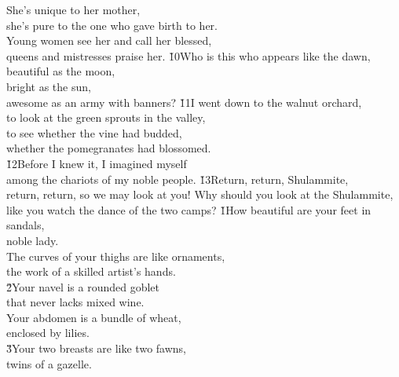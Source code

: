 \begin{poetry}
\poeml She's unique to her mother, \\
\poemll    she's pure to the one who gave birth to her. \\
\poeml Young women see her and call her blessed, \\
\poemll    queens and mistresses praise her.
\poeml \v{10}Who is this who appears like the dawn, \\
\poemll    beautiful as the moon, \\
\poeml bright as the sun, \\
\poemll    awesome as an army with banners?
\poeml \v{11}I went down to the walnut orchard, \\
\poemll    to look at the green sprouts in the valley, \\
\poeml to see whether the vine had budded, \\
\poemll    whether the pomegranates had blossomed. \\
\poeml \v{12}Before I knew it, I imagined myself \\
\poemll    among the chariots of my noble people.
\poeml \v{13}Return, return, Shulammite, \\
\poemll    return, return, so we may look at you!
\poeml Why should you look at the Shulammite, \\
\poemll    like you watch the dance of the two camps?
\poeml {}
\v{1}How beautiful are your feet in sandals, \\
\poeml noble lady. \\
\poeml The curves of your thighs are like ornaments, \\
\poemll    the work of a skilled artist's hands. \\
\poeml \v{2}Your navel is a rounded goblet \\
\poemll    that never lacks mixed wine. \\
\poeml Your abdomen is a bundle of wheat, \\
\poemll    enclosed by lilies. \\
\poeml \v{3}Your two breasts are like two fawns, \\
\poemll    twins of a gazelle. \\

\end{poetry}
